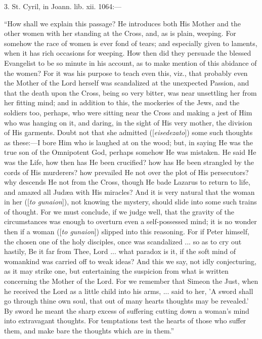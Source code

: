3. St. Cyril, in Joann. lib. xii. 1064:—


``How shall we explain this passage? He introduces both His
Mother and the other women with her standing at the Cross, and, as is
plain, weeping. For somehow the race of women is ever fond of tears; and
especially given to laments, when it has rich occasions for weeping. How
then did they persuade the blessed Evangelist to be so minute in his
account, as to make mention of this abidance of the women? For it was
his purpose to teach even this, viz., that probably even the Mother of
the Lord herself was scandalized at the unexpected Passion, and that the
death upon the Cross, being so very bitter, was near unsettling her from
her fitting mind; and in addition to this, the mockeries of the Jews,
and the soldiers too, perhaps, who were sitting near the Cross and
making a jest of Him who was hanging on it, and daring, in the sight of
His very mother, the division of His garments. Doubt not that she
admitted ([\emph{eisedezato}]) some such thoughts as these:—I bore Him
who is laughed at on the wood; but, in saying He was the true son of the
Omnipotent God, perhaps somehow He was mistaken. He said He was the
Life, how then has He been crucified? how has He been strangled by the
cords of His murderers? how prevailed He not over the plot of His
persecutors? why descends He not from the Cross, though He bade Lazarus
to return to life, and amazed all Judæa with His miracles? And it
is very natural that the woman in her ([\emph{to gunaion}]), not knowing
the mystery, should slide into some such trains of thought. For we must
conclude, if we judge well, that the gravity of the circumstances was
enough to overturn even a self-possessed mind; it is no wonder then if a
woman ([\emph{to gunaion}]) slipped into this reasoning. For if Peter
himself, the chosen one of the holy disciples, once was scandalized ...
so as to cry out hastily, Be it far from Thee, Lord ... what paradox is
it, if the soft mind of womankind was carried off to weak ideas? And
this we say, not idly conjecturing, as it may strike one, but
entertaining the suspicion from what is written concerning the Mother of
the Lord. For we remember that Simeon the Just, when he received the
Lord as a little child into his arms, ... said to her, 'A sword
shall go through thine own soul, that out of many hearts thoughts may be
revealed.' By sword he meant the sharp excess of suffering cutting down
a woman's mind into extravagant thoughts. For temptations test the
hearts of those who suffer them, and make bare the thoughts which are in
them.''


